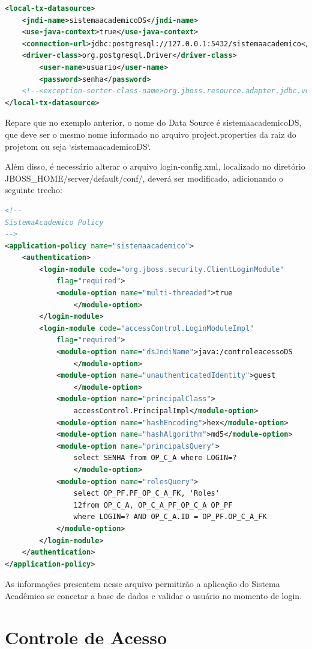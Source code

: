 \begin{lstlisting}[language=xml]
<local-tx-datasource>
	<jndi-name>sistemaacademicoDS</jndi-name>
	<use-java-context>true</use-java-context>
	<connection-url>jdbc:postgresql://127.0.0.1:5432/sistemaacademico</connection-url> 
	<driver-class>org.postgresql.Driver</driver-class>
		<user-name>usuario</user-name>
		<password>senha</password>
	<!--<exception-sorter-class-name>org.jboss.resource.adapter.jdbc.vendor.OracleExceptionSorter</exception-sorter-class-name>-->
</local-tx-datasource>
\end{lstlisting}

Repare que no exemplo anterior, o nome do Data Source é sistemaacademicoDS, que
deve ser o mesmo nome informado no arquivo project.properties da raiz do projetom ou
seja `sistemaacademicoDS`.

Além disso, é necessário alterar o arquivo login-config.xml, localizado no
diretório JBOSS\_HOME/server/default/conf/, deverá ser modificado, adicionando o
seguinte trecho:

\begin{lstlisting}[language=xml]
<!--
SistemaAcademico Policy
-->
<application-policy name="sistemaacademico">
	<authentication>
		<login-module code="org.jboss.security.ClientLoginModule"
			flag="required">
			<module-option name="multi-threaded">true
				</module-option>
		</login-module>
		<login-module code="accessControl.LoginModuleImpl" 
			flag="required">
			<module-option name="dsJndiName">java:/controleacessoDS
				</module-option>
			<module-option name="unauthenticatedIdentity">guest
				</module-option>
			<module-option name="principalClass">
				accessControl.PrincipalImpl</module-option> 
			<module-option name="hashEncoding">hex</module-option> 
			<module-option name="hashAlgorithm">md5</module-option>
			<module-option name="principalsQuery">
				select SENHA from OP_C_A where LOGIN=?
				</module-option>
			<module-option name="rolesQuery">
				select OP_PF.PF_OP_C_A_FK, 'Roles'
				12from OP_C_A, OP_C_A_PF_OP_C_A OP_PF
				where LOGIN=? AND OP_C_A.ID = OP_PF.OP_C_A_FK
			</module-option>
		</login-module>
	</authentication>
</application-policy>
\end{lstlisting}

As informações presentem nesse arquivo permitirão a aplicação do Sistema Acadêmico se
conectar a base de dados e validar o usuário no momento de login.

\section{Controle de Acesso}

